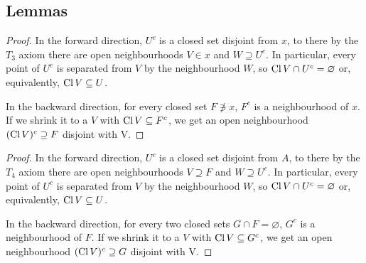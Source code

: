 \subsection{Lemmas}


\begin{proof}
    In the forward direction, \( U^c \) is a closed set disjoint from \( x \), to there by the \( T_3 \) axiom there are open neighbourhoods \( V \in x \) and \( W \supseteq U^c \). In particular, every point of \( U^c \) is separated from \( V \) by the neighbourhood \( W \), so \( \operatorname{Cl} V \cap U^c = \varnothing \) or, equivalently, \( \operatorname{Cl} V \subseteq U \).

    In the backward direction, for every closed set \( F \not\ni x \), \( F^c \) is a neighbourhood of \( x \). If we shrink it to a \( V \) with \( \operatorname{Cl} V \subseteq F^c \), we get an open neighbourhood \( (\operatorname{Cl} V)^c \supseteq F \) disjoint with V.
\end{proof}


\begin{proof}
In the forward direction, \( U^c \) is a closed set disjoint from \( A \), to there by the \( T_4 \) axiom there are open neighbourhoods \( V \supseteq F \) and \( W \supseteq U^c \). In particular, every point of \( U^c \) is separated from \( V \) by the neighbourhood \( W \), so \( \operatorname{Cl} V \cap U^c = \varnothing \) or, equivalently, \( \operatorname{Cl} V \subseteq U \).

In the backward direction, for every two closed sets \( G \cap F = \varnothing \), \( G^c \) is a neighbourhood of \( F \). If we shrink it to a \( V \) with \( \operatorname{Cl} V \subseteq G^c \), we get an open neighbourhood \( (\operatorname{Cl} V)^c \supseteq G \) disjoint with V.
\end{proof}
